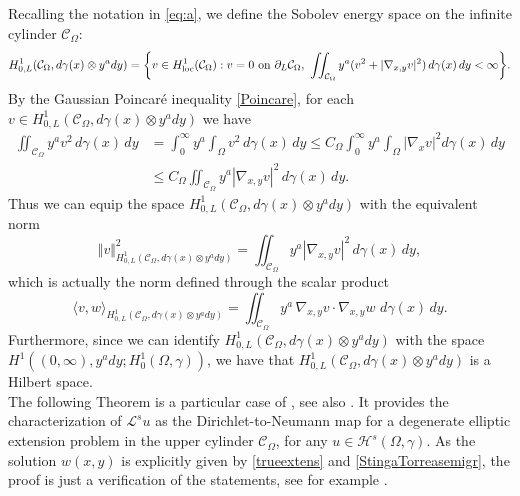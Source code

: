 \documentclass[a4paper,10pt,reqno]{amsart}
\numberwithin{equation}{section}
\begin{document}
Recalling the notation in \eqref{eq:a}, we define the Sobolev energy space on the infinite cylinder $\mathcal{C}_{\Omega}$:
\[
H_{0,L}^{1}(\mathcal{C}_{\Omega},d\gamma(x)\otimes y^ady)=\bigg\{  v\in
H_{\mathrm{loc}}^{1}(\mathcal{C}_{\Omega}):v=0~\hbox{on}~\partial_{L}
\mathcal{C}_{\Omega},~\iint_{\mathcal{C}_{\Omega}}y^a(v^{2}+|\nabla
_{x,y}v|^{2})\,d\gamma(x)\,dy<\infty\bigg\}.
\]
By the Gaussian Poincar\'{e} inequality \eqref{Poincare}, for each
$v\in H_{0,L}^{1}(\mathcal{C}_{\Omega},d\gamma(x)\otimes y^ady)$ we have
\begin{align*}
\iint_{\mathcal{C}_{\Omega}}y^av^{2}\,d\gamma(x)\,dy  &  =\int_{0}^{\infty
}y^a\int_{\Omega}v^{2}\,d\gamma(x)\,dy\leq C_{\Omega}\int_{0}^{\infty}
y^a\int_{\Omega}|\nabla_{x}v|^{2}d\gamma(x)\,dy\\
&  \leq C_{\Omega}\iint_{\mathcal{C}_{\Omega}}y^a|\nabla_{x,y}v|^{2}
\,d\gamma(x)\,dy.
\end{align*}
Thus we can equip the space $H_{0,L}^{1}(\mathcal{C}_{\Omega},d\gamma
(x)\otimes y^ady)$ with the equivalent norm
\[
\Vert v\Vert_{H_{0,L}^{1}(\mathcal{C}_{\Omega},d\gamma(x)\otimes y^ady)}
^{2}=\iint_{\mathcal{C}_{\Omega}}y^a|\nabla_{x,y}v|^{2}\,d\gamma(x)\,dy,
\]
which is actually the norm defined through the scalar product
\[
\langle v,w\rangle_{H_{0,L}^{1}(\mathcal{C}_{\Omega},d\gamma
(x)\otimes y^ady)}=\iint_{\mathcal{C}_{\Omega}}y^a\,\nabla_{x,y}v\cdot \nabla_{x,y}w\,\,d\gamma(x)\,dy.
\]
Furthermore, since we can identify $H_{0,L}^{1}(\mathcal{C}_{\Omega},d\gamma(x)\otimes y^ady)$
with the space $H^{1}((0,\infty),y^ady;H_{0}^{1}(\Omega,\gamma))$,
we have that $H_{0,L}^{1}(\mathcal{C}_{\Omega},d\gamma(x)\otimes y^ady)$ is a
Hilbert space.\\[0.5pt]

The following Theorem is a particular case of \cite[Theorem~1.1]{Stinga-Torrea},
see also \cite{Caffarelli-Stinga, Gale-Miana-Stinga, Stinga-Zhang}.
It provides the characterization of $\mathcal{L}^su$ as the Dirichlet-to-Neumann map
for a degenerate elliptic extension problem in the upper cylinder $\mathcal{C}_{\Omega}$, for any
$u\in\mathcal{H}^s(\Omega,\gamma)$. As the solution $w(x,y)$
is explicitly given by \eqref{trueextens} and \eqref{StingaTorreasemigr},
the proof is just a verification of the statements, see for example \cite{Stinga-Torrea,StingaVolz}.
\end{document}
